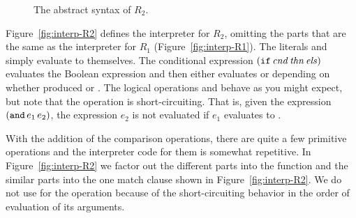 \documentclass[11pt]{book}
\newcommand{\gray}[1]{{\color{lightgray} #1}}
\begin{document}
\begin{figure}[tp]
\centering
\fbox{
\begin{minipage}{0.96\textwidth}
\[
\begin{array}{lcl}
  \itm{bool} &::=& \key{\#t} \mid \key{\#f} \\
  \itm{cmp} &::= & \key{eq?} \mid \key{<} \mid \key{<=} \mid \key{>} \mid \key{>=} \\
\Exp &::=& \gray{\INT{\Int} \mid \READ{} \mid \NEG{\Exp}} \\
     &\mid& \gray{\ADD{\Exp}{\Exp}}
      \mid \BINOP{\code{'-}}{\Exp}{\Exp} \\
     &\mid& \gray{\VAR{\Var} \mid \LET{\Var}{\Exp}{\Exp}} \\
     &\mid& \BOOL{\itm{bool}} 
      \mid \AND{\Exp}{\Exp}\\
     &\mid& \OR{\Exp}{\Exp}
      \mid \NOT{\Exp} \\
      &\mid& \BINOP{\code{'}\itm{cmp}}{\Exp}{\Exp} \mid \IF{\Exp}{\Exp}{\Exp} \\
  R_2 &::=& \PROGRAM{\key{'()}}{\Exp}
\end{array}
\]
\end{minipage}
}
\caption{The abstract syntax of $R_2$.}
\label{fig:r2-syntax}
\end{figure}

Figure~\ref{fig:interp-R2} defines the interpreter for $R_2$, omitting
the parts that are the same as the interpreter for $R_1$
(Figure~\ref{fig:interp-R1}). The literals  and 
simply evaluate to themselves. The conditional expression $(\texttt{if}\,
\mathit{cnd}\,\mathit{thn}\,\mathit{els})$ evaluates the Boolean expression
 and then either evaluates  or  depending
on whether  produced  or . The logical
operations  and  behave as you might expect, but
note that the  operation is short-circuiting. That is, given
the expression $(\texttt{and}\,e_1\,e_2)$, the expression $e_2$ is not
evaluated if $e_1$ evaluates to .

With the addition of the comparison operations, there are quite a few
primitive operations and the interpreter code for them is somewhat
repetitive. In Figure~\ref{fig:interp-R2} we factor out the different
parts into the  function and the similar parts into
the one match clause shown in Figure~\ref{fig:interp-R2}. We do not
use  for the  operation because of the
short-circuiting behavior in the order of evaluation of its arguments.
\end{document}
